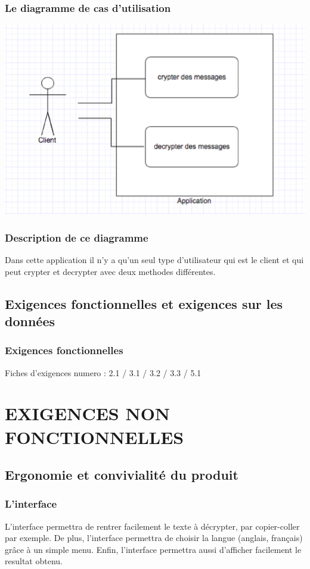 \documentclass[a4]{article}
\begin{document}
			\subsubsection {Le diagramme de cas d'utilisation} 
				\includegraphics[scale=0.5]{dia.eps} 
			\subsubsection {Description de ce diagramme}
				Dans cette application il n'y a qu'un seul type d'utilisateur qui est le client 
				et qui peut crypter et decrypter avec deux methodes différentes.
		\subsection{Exigences fonctionnelles et exigences sur les données}
			\subsubsection {Exigences fonctionnelles}
				Fiches d'exigences numero : 2.1 / 3.1 / 3.2 / 3.3 / 5.1
	\section{EXIGENCES NON FONCTIONNELLES}
		\subsection{Ergonomie et convivialité du produit}
			\subsubsection {L'interface}
				L'interface permettra de rentrer facilement le texte à décrypter, par copier-coller par exemple.
				De plus, l'interface permettra de choisir la langue (anglais, français) grâce à un simple menu.
				Enfin, l'interface permettra aussi d'afficher facilement le resultat obtenu.
\end{document}
